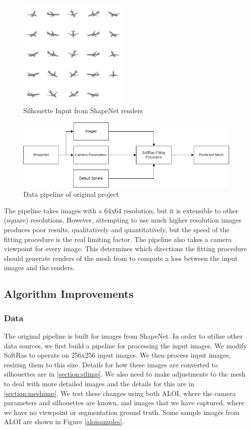 \documentclass{article}
\begin{document}
\begin{figure}[h!]
  \centering
  \includegraphics[width=0.5\textwidth]{images/shapenetinput.png}
  \caption{Silhouette Input from ShapeNet renders}
  \label{shapenetinput}
\end{figure}

\begin{figure}[h!]
  \centering
  \includegraphics[width=\textwidth]{images/shapenetdatapipe.png}
  \caption{Data pipeline of original project}
  \label{shapenetdatapipe}
\end{figure}

The pipeline takes images with a 64x64 resolution, but it is extensible to other (square) resolutions. However, attempting to use much higher resolution images produces poor results, qualitatively and quantitatively, but the speed of the fitting procedure is the real limiting factor. The pipeline also takes a camera viewpoint for every image. This determines which directions the fitting procedure should generate renders of the mesh from to compute a loss between the input images and the renders.

\subsection{Algorithm Improvements}
\subsubsection{Data}
The original pipeline is built for images from ShapeNet. In order to utilise other data sources, we first build a pipeline for processing the input images. We modify SoftRas to operate on 256x256 input images. We then process input images, resizing them to this size. Details for how these images are converted to silhouettes are in \ref{section:silimp}. We also need to make adjustments to the mesh to deal with more detailed images and the details for this are in \ref{section:meshimp}. We test these changes using both ALOI, where the camera parameters and silhouettes are known, and images that we have captured, where we have no viewpoint or segmentation ground truth. Some sample images from ALOI are shown in Figure \ref{aloisamples}.
\end{document}
